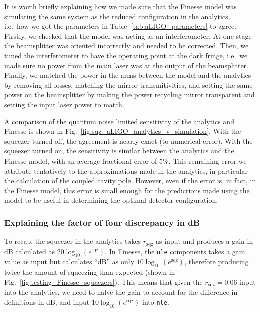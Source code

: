 \documentclass[aps,pra,superscriptaddress,reprint,nofootinbib]{revtex4-1}
\newcommand{\code}[1]{\texttt{#1}}
\begin{document}
It is worth briefly explaining how we made sure that the Finesse model was simulating the same system as the reduced configuration in the analytics, i.e.\ how we got the parameters in Table~\ref{tab:aLIGO_parameters} to agree. Firstly, we checked that the model was acting as an interferometer. At one stage the beamsplitter was oriented incorrectly and needed to be corrected. Then, we tuned the interferometer to have the operating point at the dark fringe, i.e.\ we made sure no power from the main laser was at the output of the beamsplitter. Finally, we matched the power in the arms between the model and the analytics by removing all losses, matching the mirror transmitivities, and setting the same power on the beamsplitter by making the power recycling mirror transparent and setting the input laser power to match.


A comparison of the quantum noise limited sensitivity of the analytics and Finesse is shown in Fig.~\ref{fig:sqz_aLIGO_analytics_v_simulation}. With the squeezer turned off, the agreement is nearly exact (to numerical error). With the squeezer turned on, the sensitivity is similar between the analytics and the Finesse model, with an average fractional error of $5\%$.
This remaining error we attribute tentatively to the approximations made in the analytics, in particular the calculation of the coupled cavity pole. However, even if the error is, in fact, in the Finesse model, this error is small enough for the predictions made using the model to be useful in determining the optimal detector configuration.


\subsubsection{Explaining the factor of four discrepancy in dB}

To recap, the squeezer in the analytics takes $r_\mathrm{sqz}$ as input and produces a gain in dB calculated as $20 \log_{10}(e^\mathrm{sqz})$. In Finesse, the \code{nle} components takes a gain value as input but calculates “dB” as only $10 \log_{10}(e^\mathrm{sqz})$, therefore producing twice the amount of squeezing than expected (shown in Fig.~\ref{fig:testing_Finesse_squeezers}). This means that given the $r_\mathrm{sqz} = 0.06$ input into the analytics, we need to halve the gain to account for the difference in definitions in dB, and input $10 \log_{10}(e^\mathrm{sqz})$ into \code{nle}.
\end{document}
